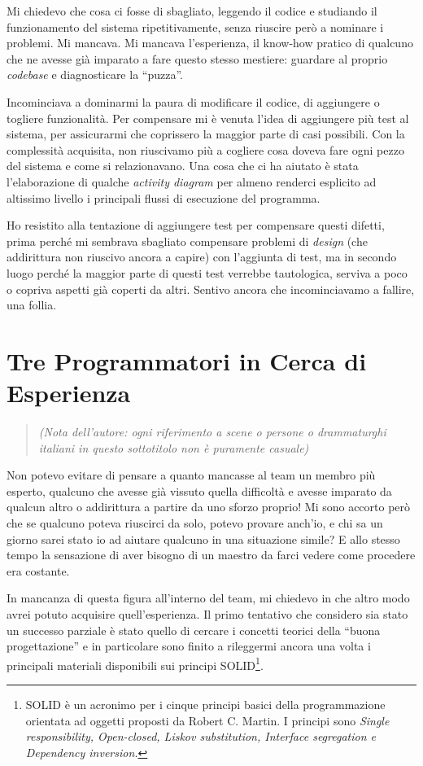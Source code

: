 \documentclass[12pt]{report}
\begin{document}
Mi chiedevo che cosa ci fosse di sbagliato, leggendo il codice e studiando il 
funzionamento del sistema ripetitivamente, senza riuscire però
a nominare i problemi. Mi mancava. Mi mancava l'esperienza, il know-how pratico
di qualcuno che ne avesse già imparato a fare questo stesso mestiere: guardare al 
proprio \textit{codebase} e diagnosticare la ``puzza''. 

Incominciava a dominarmi la paura di modificare il codice, di aggiungere o 
togliere funzionalità. Per compensare mi è venuta l'idea di aggiungere più test
al sistema, per assicurarmi che coprissero la maggior parte di casi possibili.
Con la complessità acquisita, non riuscivamo più a cogliere cosa doveva fare 
ogni pezzo del sistema e come si relazionavano. Una cosa che ci ha aiutato è
stata l'elaborazione di qualche \textit{activity diagram} per almeno renderci 
esplicito ad altissimo livello i principali flussi di esecuzione del programma. 

Ho resistito alla tentazione di aggiungere test per compensare questi difetti,
prima perché mi sembrava sbagliato compensare problemi di \textit{design} (che
addirittura non riuscivo ancora a capire) con l'aggiunta
di test, ma in secondo luogo perché la maggior parte di questi test verrebbe
tautologica, serviva a poco o copriva aspetti già coperti da altri. 
Sentivo ancora che incominciavamo a fallire, una follia.

\section{Tre Programmatori in Cerca di Esperienza}

\begin{quote}
\textit{
(Nota dell'autore: ogni riferimento a scene o persone o drammaturghi italiani
in questo sottotitolo non è puramente casuale)
}
\end{quote}

Non potevo evitare di pensare a quanto mancasse al team un membro più esperto,
qualcuno che avesse già vissuto quella difficoltà e avesse imparato 
da qualcun altro o addirittura a partire da uno sforzo proprio! 
Mi sono accorto però che se qualcuno poteva riuscirci da solo, potevo provare
anch'io, e chi sa un giorno sarei stato io ad aiutare qualcuno in una situazione 
simile? E allo stesso tempo la sensazione di aver bisogno di un maestro da farci
vedere come procedere era costante.

In mancanza di questa figura all'interno del team, mi chiedevo in che altro modo 
avrei potuto acquisire quell'esperienza. Il primo tentativo 
che considero sia stato un successo parziale è stato quello di 
cercare i concetti teorici della ``buona progettazione'' 
e in particolare sono finito a rileggermi ancora una volta 
i principali materiali disponibili sui principi SOLID\footnote{
SOLID è un acronimo per i cinque principi basici della programmazione
orientata ad oggetti proposti da Robert C. Martin. I principi sono \textit{
Single
responsibility, Open-closed, Liskov substitution, 
Interface segregation e Dependency inversion.
}
}. 
\end{document}
